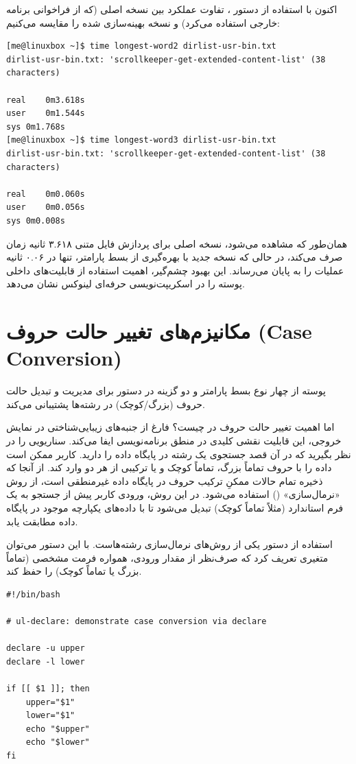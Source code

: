 اکنون با استفاده از دستور ، تفاوت عملکرد بین نسخه اصلی (که از فراخوانی برنامه خارجی استفاده می‌کرد) و نسخه بهینه‌سازی شده را مقایسه می‌کنیم:

\begin{latin}
\begin{lstlisting}
[me@linuxbox ~]$ time longest-word2 dirlist-usr-bin.txt
dirlist-usr-bin.txt: 'scrollkeeper-get-extended-content-list' (38 characters)

real	0m3.618s
user	0m1.544s
sys	0m1.768s
[me@linuxbox ~]$ time longest-word3 dirlist-usr-bin.txt
dirlist-usr-bin.txt: 'scrollkeeper-get-extended-content-list' (38 characters)

real	0m0.060s
user	0m0.056s
sys	0m0.008s
\end{lstlisting}
\end{latin}

همان‌طور که مشاهده می‌شود، نسخه اصلی برای پردازش فایل متنی ۳.۶۱۸ ثانیه زمان صرف می‌کند، در حالی که نسخه جدید با بهره‌گیری از بسط پارامتر، تنها در ۰.۰۶ ثانیه عملیات را به پایان می‌رساند. این بهبود چشم‌گیر، اهمیت استفاده از قابلیت‌های داخلی پوسته را در اسکریپت‌نویسی حرفه‌ای لینوکس نشان می‌دهد.

\section{مکانیزم‌های تغییر حالت حروف (Case Conversion)}

پوسته  از چهار نوع بسط پارامتر و دو گزینه در دستور  برای مدیریت و تبدیل حالت حروف (بزرگ/کوچک) در رشته‌ها پشتیبانی می‌کند.

اما اهمیت تغییر حالت حروف در چیست؟ فارغ از جنبه‌های زیبایی‌شناختی در نمایش خروجی، این قابلیت نقشی کلیدی در منطق برنامه‌نویسی ایفا می‌کند. سناریویی را در نظر بگیرید که در آن قصد جستجوی یک رشته در پایگاه داده را دارید. کاربر ممکن است داده را با حروف تماماً بزرگ، تماماً کوچک و یا ترکیبی از هر دو وارد کند. از آنجا که ذخیره تمام حالات ممکنِ ترکیب حروف در پایگاه داده غیرمنطقی است، از روش «نرمال‌سازی» () استفاده می‌شود. در این روش، ورودی کاربر پیش از جستجو به یک فرم استاندارد (مثلاً تماماً کوچک) تبدیل می‌شود تا با داده‌های یکپارچه موجود در پایگاه داده مطابقت یابد.

استفاده از دستور  یکی از روش‌های نرمال‌سازی رشته‌هاست. با این دستور می‌توان متغیری تعریف کرد که صرف‌نظر از مقدار ورودی، همواره فرمت مشخصی (تماماً بزرگ یا تماماً کوچک) را حفظ کند.

\begin{latin}
\begin{lstlisting}
#!/bin/bash

# ul-declare: demonstrate case conversion via declare

declare -u upper
declare -l lower

if [[ $1 ]]; then
    upper="$1"
    lower="$1"
    echo "$upper"
    echo "$lower"
fi
\end{lstlisting}
\end{latin}

